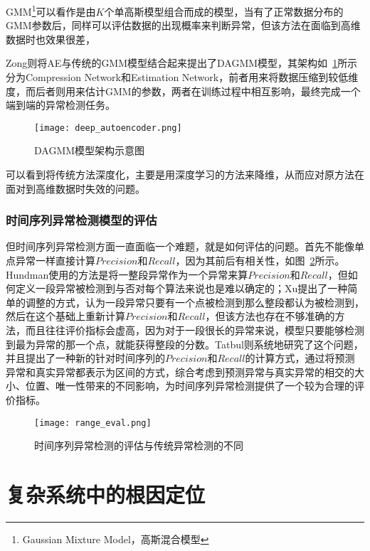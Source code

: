 GMM\footnote{Gaussian Mixture Model，高斯混合模型}\cite{reynolds2009gaussian}可以看作是由$K$个单高斯模型组合而成的模型，当有了正常数据分布的GMM参数后，同样可以评估数据的出现概率来判断异常，但该方法在面临到高维数据时也效果很差，{Zong\cite{zong2018deep}则将AE与传统的GMM模型结合起来提出了DAGMM模型，其架构如~\ref{fig:deep:autoencoder}所示分为Compression Network和Estimation Network，前者用来将数据压缩到较低维度，而后者则用来估计GMM的参数，两者在训练过程中相互影响，最终完成一个端到端的异常检测任务。

\begin{figure}[htbp]
  \centering
  \texttt{[image: deep\_autoencoder.png]}
  \caption{DAGMM模型架构示意图\cite{malhotra2016lstm}}
  \label{fig:deep:autoencoder}
\end{figure}

可以看到将传统方法深度化，主要是用深度学习的方法来降维，从而应对原方法在面对到高维数据时失效的问题。

\subsubsection{时间序列异常检测模型的评估}
但时间序列异常检测方面一直面临一个难题，就是如何评估的问题。首先不能像单点异常一样直接计算$Precision$和$Recall$，因为其前后有相关性，如图~\ref{fig:range:eval}所示。Hundman\cite{DBLP:conf/kdd/HundmanCLCS18}使用的方法是将一整段异常作为一个异常来算$Precision$和$Recall$，但如何定义一段异常被检测到与否对每个算法来说也是难以确定的；Xu\cite{xu2018unsupervised}提出了一种简单的调整的方式，认为一段异常只要有一个点被检测到那么整段都认为被检测到，然后在这个基础上重新计算$Precision$和$Recall$，但该方法也存在不够准确的方法，而且往往评价指标会虚高，因为对于一段很长的异常来说，模型只要能够检测到最为异常的那一个点，就能获得整段的分数。Tatbul\cite{tatbul2018precision}则系统地研究了这个问题，并且提出了一种新的针对时间序列的$Precision$和$Recall$的计算方式，通过将预测异常和真实异常都表示为区间的方式，综合考虑到预测异常与真实异常的相交的大小、位置、唯一性带来的不同影响，为时间序列异常检测提供了一个较为合理的评价指标。
\begin{figure}[htbp]
    \centering
    \texttt{[image: range\_eval.png]}
    \caption{时间序列异常检测的评估与传统异常检测的不同\cite{tatbul2018precision}}
    \label{fig:range:eval}
  \end{figure}

\section{复杂系统中的根因定位}

}
